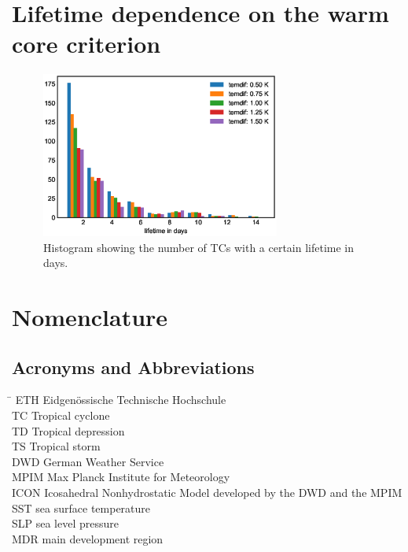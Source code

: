
\chapter{Lifetime dependence on the warm core criterion}\label{sec:lifetime-appendix}

\begin{figure}[ht]
	\centering
	\includegraphics[width=0.7\textwidth]{img/lifetime_for_different_temdif.eps}
	\caption{Histogram showing the number of TCs with a certain lifetime in days.}
\end{figure}

 
 

\chapter*{Nomenclature}\label{chap:symbole}
 
\section*{Acronyms and Abbreviations}
\begin{tabbing}
 \hspace*{1.6cm}  \= \kill
 ETH \> Eidgen\"{o}ssische Technische Hochschule \\[0.5ex]
 TC \> Tropical cyclone \\[0.5ex]
  TD \> Tropical depression \\[0.5ex]
 TS \> Tropical storm \\[0.5ex]
 DWD \> German Weather Service\\[0.5ex]
 MPIM \> Max Planck Institute for Meteorology\\[0.5ex]
ICON \> Icosahedral Nonhydrostatic Model developed by the DWD and the
MPIM\\[0.5ex]
SST \> sea surface temperature\\[0.5ex]
SLP \> sea level pressure\\[0.5ex]
MDR \> main development region  \\[0.5ex]
\end{tabbing}

